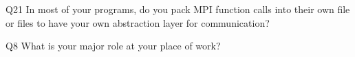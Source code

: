 \begin{description}%
\item{Q21} In most of your programs, do you pack MPI function calls into their own file or files to have your own abstraction layer for communication?%
\item{Q8} What is your major role at your place of work?%
\end{description}%
